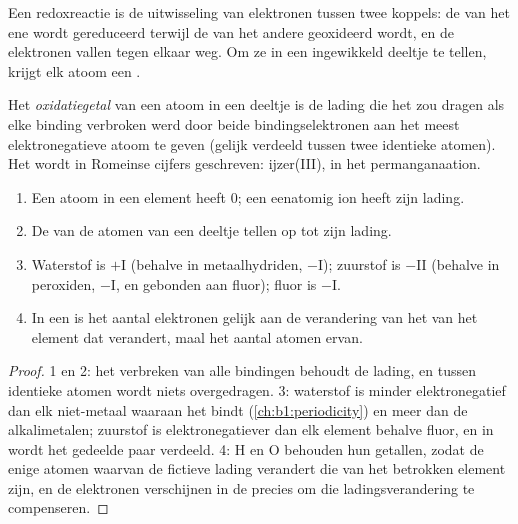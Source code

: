 Een redoxreactie is de uitwisseling van elektronen tussen twee koppels:
de  van het ene wordt gereduceerd terwijl de  van het
andere geoxideerd wordt, en de elektronen vallen tegen elkaar weg. Om ze
in een ingewikkeld deeltje te tellen, krijgt elk atoom een
.

\begin{definition}[Oxidatiegetal]\label{def:b1:nernst:oxidation-number}
Het \emph{oxidatiegetal} van een atoom in een
deeltje is de lading die het zou dragen als elke binding verbroken werd
door beide bindingselektronen aan het meest elektronegatieve atoom te
geven (gelijk verdeeld tussen twee identieke atomen). Het wordt in
Romeinse cijfers geschreven: ijzer(III),  in het
permanganaation.
\end{definition}

\begin{proposition}\label{prop:b1:nernst:on-rules}
\begin{enumerate}
  \item Een atoom in een element heeft  0; een eenatomig ion
        heeft zijn lading.
  \item De  van de atomen van een deeltje tellen op tot
        zijn lading.
  \item Waterstof is $+$I (behalve in metaalhydriden, $-$I); zuurstof is
        $-$II (behalve in peroxiden, $-$I, en gebonden aan fluor); fluor is
        $-$I.
  \item In een  is het aantal elektronen gelijk aan de
        verandering van het  van het element dat verandert,
        maal het aantal atomen ervan.
\end{enumerate}
\end{proposition}

\begin{proof}
1 en 2: het verbreken van alle bindingen behoudt de lading, en tussen
identieke atomen wordt niets overgedragen. 3: waterstof is minder
elektronegatief dan elk niet-metaal waaraan het bindt
(\cref{ch:b1:periodicity}) en meer dan de alkalimetalen; zuurstof is
elektronegatiever dan elk element behalve fluor, en in  wordt het
gedeelde paar verdeeld. 4: H en O behouden hun getallen, zodat de enige
atomen waarvan de fictieve lading verandert die van het betrokken element
zijn, en de elektronen verschijnen in de  precies om die
ladingsverandering te compenseren.
\end{proof}

